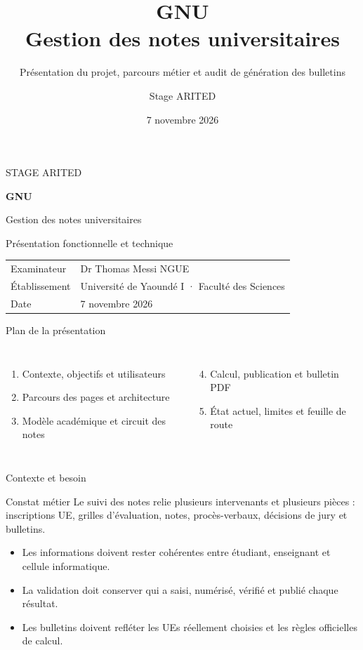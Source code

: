 \documentclass[aspectratio=169,12pt]{beamer}
\title{GNU\\Gestion des notes universitaires}
\subtitle{Présentation du projet, parcours métier et audit de génération des bulletins}
\author{Stage ARITED}
\institute{Université de Yaoundé I · Faculté des Sciences}
\date{7 novembre 2026}
\begin{document}
\begin{frame}[plain]
  \vfill
  {\color{GNUteal}\large STAGE ARITED}\par\vspace{.7em}
  {\color{GNUdark}\fontsize{30}{34}\selectfont\bfseries GNU}\par
  {\color{GNUdark}\LARGE Gestion des notes universitaires}\par\vspace{1em}
  {\color{GNUmuted}\large Présentation fonctionnelle et technique}\par
  \vspace{1.5em}
  \begin{tabular}{@{}ll@{}}
    Examinateur & Dr Thomas Messi NGUE\\
    Établissement & Université de Yaoundé I · Faculté des Sciences\\
    Date & 7 novembre 2026
  \end{tabular}
  \vfill
\end{frame}

\begin{frame}{Plan de la présentation}
  \begin{columns}[T,onlytextwidth]
      \begin{enumerate}
        \item Contexte, objectifs et utilisateurs
        \item Parcours des pages et architecture
        \item Modèle académique et circuit des notes
      \end{enumerate}
      \begin{enumerate}\setcounter{enumi}{3}
        \item Calcul, publication et bulletin PDF
        \item État actuel, limites et feuille de route
      \end{enumerate}
  \end{columns}
\end{frame}

\begin{frame}{Contexte et besoin}
  \begin{block}{Constat métier}
    Le suivi des notes relie plusieurs intervenants et plusieurs pièces : inscriptions UE, grilles d’évaluation, notes, procès-verbaux, décisions de jury et bulletins.
  \end{block}
  \begin{itemize}
    \item Les informations doivent rester cohérentes entre étudiant, enseignant et cellule informatique.
    \item La validation doit conserver qui a saisi, numérisé, vérifié et publié chaque résultat.
    \item Les bulletins doivent refléter les UEs réellement choisies et les règles officielles de calcul.
  \end{itemize}
\end{frame}
\end{document}
